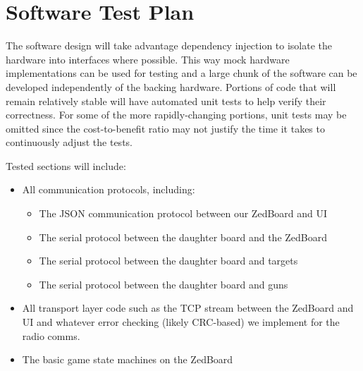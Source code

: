 \documentclass{article}
\begin{document}
\section*{Software Test Plan}

The software design will take advantage dependency injection to isolate the hardware into interfaces where possible.
This way mock hardware implementations can be used for testing and a large chunk of the software can be developed
independently of the backing hardware.
Portions of code that will remain relatively stable will have automated unit tests to help verify their correctness.
For some of the more rapidly-changing portions, unit tests may be omitted since the cost-to-benefit ratio
may not justify the time it takes to continuously adjust the tests.

Tested sections will include:
\begin{itemize}
\item All communication protocols, including:
	\begin{itemize}
	\item The JSON communication protocol between our ZedBoard and UI
	\item The serial protocol between the daughter board and the ZedBoard
	\item The serial protocol between the daughter board and targets
	\item The serial protocol between the daughter board and guns
	\end{itemize}
\item All transport layer code such as the TCP stream between the ZedBoard and UI and whatever error checking
	 (likely CRC-based) we implement for the radio comms.
\item The basic game state machines on the ZedBoard
\end{itemize}
\end{document}
